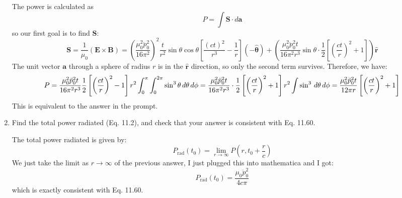 \documentclass[10pt]{article}
\begin{document}
\begin{enumerate}[label=(\alph*)]
			\begin{solution}
				The power is calculated as 
				\[
					P = \int \mathbf{S} \cdot d\mathbf{a}
				\]
				so our first goal is to find \( \mathbf{S} \):
				\[
					\mathbf{S} = \frac{1}{\mu_0}(\mathbf{E} \times \mathbf{B}) = \left( \frac{\mu_0^2 \ddot
					p_0^2}{16 \pi^2} \right)^2 \frac{t}{r^2} \sin \theta \cos \theta \left[ \frac{(ct)^2}{r^3} -
					\frac{1}{r} \right] (-\boldsymbol{\hat{\theta}}) + \left( \frac{\mu_0^2 \ddot p_0^2t}{16
					\pi^2 r^3}
					\sin \theta \cdot \frac{1}{2}\left[ \left( \frac{ct}{r} \right)^2 + 1 \right] \right)\mathbf{\hat{r}}
				\]
				The unit vector \( \mathbf{a} \) through a sphere of radius \( r \) is in the \(
				\mathbf{\hat{r}} \) direction, so only the second term survives. Therefore, we have:
				\[
					P = \frac{\mu_0^2 \ddot p_0^2 t}{16 \pi^2 r^3} \frac{1}{2}\left[ \left( \frac{ct}{r} \right)^2 -
					1\right] r^2 \int_{0}^{\pi}\int_{0}^{2\pi} \sin^3 \theta \,d \theta \,d \phi =
					\frac{\mu_0^2 \ddot p_0^2 t}{16 \pi^2 r^3} \cdot \frac{1}{2} \left[ \left( \frac{ct}{r} \right)^2 + 1
					\right]r^2 \int \sin^3 \,d \theta \,d \phi = \frac{\mu_0^2 \ddot p_0^2 t}{12 \pi r}
					\left[ \left( \frac{ct}{r} \right)^2 + 1 \right]
				\]
				This is equivalent to the answer in the prompt. 
			\end{solution}
		\item Find the total power radiated (Eq. 11.2), and check that your answer is consistent with Eq.
			11.60.

			\begin{solution}
				The total power radiated is given by:
				\[
					P_\text{rad}(t_0) = \lim_{r \to \infty} P\left( r, t_0 + \frac{r}{c} \right)
				\]
				We just take the limit as \( r \to \infty \) of the previous answer, I just plugged this into
				mathematica and I got:
				\[
					P_\text{rad}(t_0) = \frac{ \mu_0 \ddot p_0^2}{4 c \pi}
				\]
				which is exactly consistent with Eq. 11.60.
			\end{solution}
	\end{enumerate}

	\pagebreak
\end{document}
